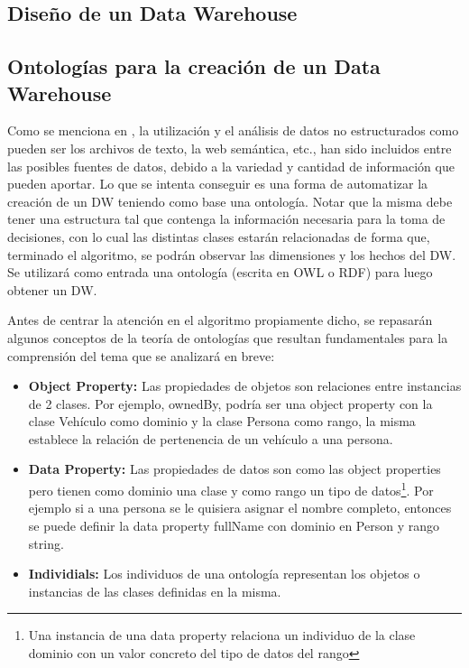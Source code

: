 \documentclass[a4paper,11pt]{article}
\begin{document}
\begin{flushleft}
    \subsection{Diseño de un Data Warehouse} 
    
    
    \subsection{Ontologías para la creación de un Data Warehouse}
    
    Como se menciona en \cite{ontologias}, la utilización y el análisis de datos no estructurados como pueden ser los archivos de texto, la web
    semántica, etc., han sido incluidos entre las posibles fuentes de datos, debido a la variedad y cantidad de información que pueden aportar. Lo que
    se intenta conseguir es una forma de automatizar la creación de un DW teniendo como base una ontología. Notar que la misma debe tener una
    estructura tal que contenga la información necesaria para la toma de decisiones, con lo cual las distintas clases estarán relacionadas de forma
    que, terminado el algoritmo, se podrán observar las dimensiones y los hechos del DW. Se utilizará como entrada una ontología (escrita en OWL o RDF)
    para luego obtener un DW.\par
    
    Antes de centrar la atención en el algoritmo propiamente dicho, se repasarán algunos conceptos de la teoría de ontologías que resultan fundamentales
    para la comprensión del tema que se analizará en breve:
    
    \begin{itemize}
      \item \textbf{Object Property:} Las propiedades de objetos son relaciones entre instancias de 2 clases. Por ejemplo, ownedBy, podría ser una
      object property con la clase Vehículo como dominio y la clase Persona como rango, la misma establece la relación de pertenencia de un vehículo a
      una persona.
      \item \textbf{Data Property:} Las propiedades de datos son como las object properties pero tienen como dominio una clase y como rango un tipo de
      datos\footnote{Una instancia de una data property relaciona un individuo de la clase dominio con un valor concreto del tipo de datos del rango}.
      Por ejemplo si a una persona se le quisiera asignar el nombre completo, entonces se puede definir la data property fullName con dominio en Person
      y rango string.
      \item \textbf{Individials:} Los individuos de una ontología representan los objetos o instancias de las clases definidas en la misma.
    \end{itemize}
    

\end{flushleft}
\end{document}
